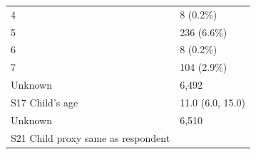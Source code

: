 \documentclass[]{article}
\begin{document}
\begin{longtable}[]{@{}ll@{}}
\begin{minipage}[t]{0.71\columnwidth}
4\strut
\end{minipage} & \begin{minipage}[t]{0.23\columnwidth}\raggedright
8 (0.2\%)\strut
\end{minipage}\tabularnewline
\begin{minipage}[t]{0.71\columnwidth}\raggedright
5\strut
\end{minipage} & \begin{minipage}[t]{0.23\columnwidth}\raggedright
236 (6.6\%)\strut
\end{minipage}\tabularnewline
\begin{minipage}[t]{0.71\columnwidth}\raggedright
6\strut
\end{minipage} & \begin{minipage}[t]{0.23\columnwidth}\raggedright
8 (0.2\%)\strut
\end{minipage}\tabularnewline
\begin{minipage}[t]{0.71\columnwidth}\raggedright
7\strut
\end{minipage} & \begin{minipage}[t]{0.23\columnwidth}\raggedright
104 (2.9\%)\strut
\end{minipage}\tabularnewline
\begin{minipage}[t]{0.71\columnwidth}\raggedright
Unknown\strut
\end{minipage} & \begin{minipage}[t]{0.23\columnwidth}\raggedright
6,492\strut
\end{minipage}\tabularnewline
\begin{minipage}[t]{0.71\columnwidth}\raggedright
S17 Child's age\strut
\end{minipage} & \begin{minipage}[t]{0.23\columnwidth}\raggedright
11.0 (6.0, 15.0)\strut
\end{minipage}\tabularnewline
\begin{minipage}[t]{0.71\columnwidth}\raggedright
Unknown\strut
\end{minipage} & \begin{minipage}[t]{0.23\columnwidth}\raggedright
6,510\strut
\end{minipage}\tabularnewline
\begin{minipage}[t]{0.71\columnwidth}\raggedright
S21 Child proxy same as respondent\strut
\end{minipage} & \begin{minipage}[t]{0.23\columnwidth}\raggedright
\strut
\end{minipage}\tabularnewline

\end{longtable}
\end{document}
